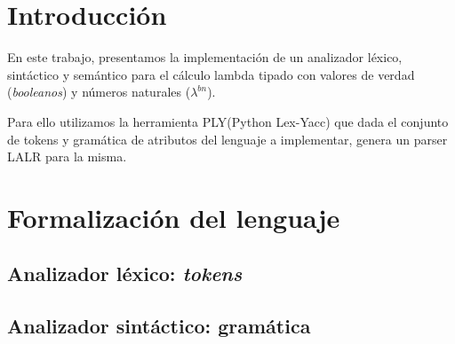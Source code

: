 \documentclass[11pt]{article}
\begin{document}

\thispagestyle{empty}
\maketitle

\newpage
\newpage
\tableofcontents

\newpage


\section{Introducción}

En este trabajo, presentamos la implementación de un analizador léxico,
sintáctico y semántico para el cálculo lambda tipado con valores de verdad
(\emph{booleanos}) y números naturales ($\lambda^{bn}$).

Para ello utilizamos la herramienta \textsc{PLY}(Python Lex-Yacc) que dada
el conjunto de tokens y gramática de atributos del lenguaje a implementar,
 genera un parser \textsc{LALR} para la misma.

\section{Formalización del lenguaje}

\subsection{Analizador léxico: \emph{tokens}}



\subsection{Analizador sintáctico: gramática}
\end{document}
